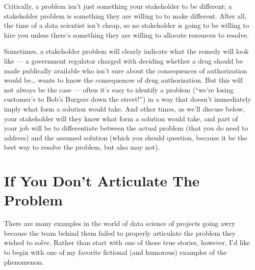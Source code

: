 \documentclass[letterpaper,10pt,english]{jupyterBook}
\begin{document}
\sphinxAtStartPar
Critically, a problem isn’t just something your stakeholder  to be different; a stakeholder problem is something they are willing to  to make different. After all, the time of a data scientist isn’t cheap, so no stakeholder is going to be willing to hire you unless there’s something they are willing to allocate resources to resolve.

\sphinxAtStartPar
Sometimes, a stakeholder problem will clearly indicate what the remedy will look like — a government regulator charged with deciding whether a drug should be made publically available who isn’t sure about the consequences of authorization would be… wants to know the consequences of drug authorization. But this will not always be the case — often it’s easy to identify a problem (“we’re losing customer’s to Bob’s Burgers down the street!”) in a way that doesn’t immediately imply what form a solution would take. And other times, as we’ll discuss below, your stakeholder will  they know what form a solution would take, and part of your job will be to differentiate between the actual problem (that you do need to address) and the assumed solution (which you should question, because it  be the best way to resolve the problem, but also may not).


\section{If You Don’t Articulate The Problem}
\label{\detokenize{20_problems_to_questions/10_solving_the_right_problem:if-you-don-t-articulate-the-problem}}
\sphinxAtStartPar
There are many examples in the world of data science of projects going awry because the team behind them failed to properly articulate the problem they wished to solve. Rather than start with one of those true stories, however, I’d like to begin with one of my favorite fictional (and humorous) examples of the phenomenon.
\end{document}
